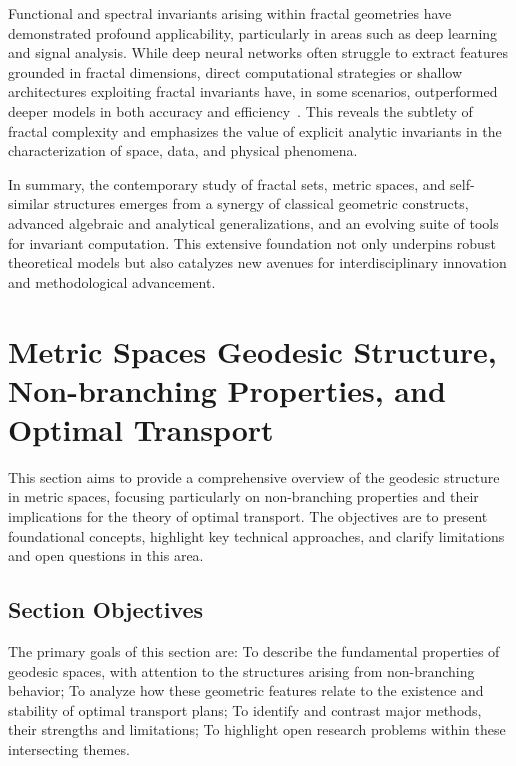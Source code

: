 \documentclass[sigconf]{acmart}
\begin{document}
Functional and spectral invariants arising within fractal geometries have demonstrated profound applicability, particularly in areas such as deep learning and signal analysis. While deep neural networks often struggle to extract features grounded in fractal dimensions, direct computational strategies or shallow architectures exploiting fractal invariants have, in some scenarios, outperformed deeper models in both accuracy and efficiency~\cite{ref92}. This reveals the subtlety of fractal complexity and emphasizes the value of explicit analytic invariants in the characterization of space, data, and physical phenomena.

In summary, the contemporary study of fractal sets, metric spaces, and self-similar structures emerges from a synergy of classical geometric constructs, advanced algebraic and analytical generalizations, and an evolving suite of tools for invariant computation. This extensive foundation not only underpins robust theoretical models but also catalyzes new avenues for interdisciplinary innovation and methodological advancement.

\section{Metric Spaces Geodesic Structure, Non-branching Properties, and Optimal Transport}

This section aims to provide a comprehensive overview of the geodesic structure in metric spaces, focusing particularly on non-branching properties and their implications for the theory of optimal transport. The objectives are to present foundational concepts, highlight key technical approaches, and clarify limitations and open questions in this area.

\subsection*{Section Objectives}
The primary goals of this section are:
To describe the fundamental properties of geodesic spaces, with attention to the structures arising from non-branching behavior;
To analyze how these geometric features relate to the existence and stability of optimal transport plans;
To identify and contrast major methods, their strengths and limitations;
To highlight open research problems within these intersecting themes.

\end{document}
